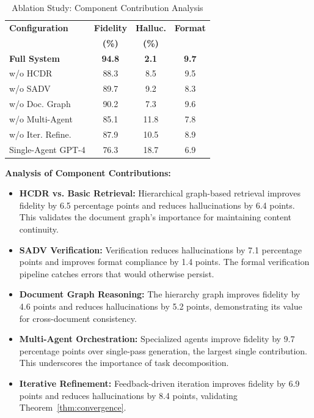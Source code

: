 \documentclass{ieeeaccess}
\begin{document}
\begin{table}[!t]
\caption{Ablation Study: Component Contribution Analysis}
\label{tab:ablation}
\centering
\renewcommand{\arraystretch}{1.2}
\footnotesize
\begin{tabular}{@{}lccc@{}}
\toprule
\textbf{Configuration} & \textbf{Fidelity} & \textbf{Halluc.} & \textbf{Format} \\
& \textbf{(\%)} & \textbf{(\%)} & \\
\midrule
\textbf{Full System} & \textbf{94.8} & \textbf{2.1} & \textbf{9.7} \\
\midrule
w/o HCDR & 88.3 & 8.5 & 9.5 \\
w/o SADV & 89.7 & 9.2 & 8.3 \\
w/o Doc. Graph & 90.2 & 7.3 & 9.6 \\
w/o Multi-Agent & 85.1 & 11.8 & 7.8 \\
w/o Iter. Refine. & 87.9 & 10.5 & 8.9 \\
\midrule
Single-Agent GPT-4 & 76.3 & 18.7 & 6.9 \\
\bottomrule
\end{tabular}
\normalsize
\end{table}
\textbf{Analysis of Component Contributions:}

\begin{itemize}
\item \textbf{HCDR vs. Basic Retrieval:} Hierarchical graph-based retrieval improves fidelity by 6.5 percentage points and reduces hallucinations by 6.4 points. This validates the document graph's importance for maintaining content continuity.

\item \textbf{SADV Verification:} Verification reduces hallucinations by 7.1 percentage points and improves format compliance by 1.4 points. The formal verification pipeline catches errors that would otherwise persist.

\item \textbf{Document Graph Reasoning:} The hierarchy graph improves fidelity by 4.6 points and reduces hallucinations by 5.2 points, demonstrating its value for cross-document consistency.

\item \textbf{Multi-Agent Orchestration:} Specialized agents improve fidelity by 9.7 percentage points over single-pass generation, the largest single contribution. This underscores the importance of task decomposition.

\item \textbf{Iterative Refinement:} Feedback-driven iteration improves fidelity by 6.9 points and reduces hallucinations by 8.4 points, validating Theorem~\ref{thm:convergence}.
\end{itemize}
\end{document}
